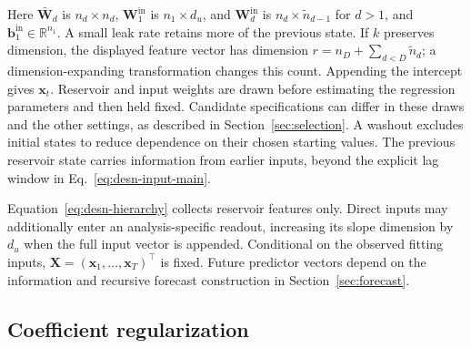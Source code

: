 \documentclass[12pt,letterpaper]{article}
\numberwithin{equation}{section}
\newcommand{\R}{\mathbb{R}}
\newcommand{\vect}[1]{\bm{#1}}
\newcommand{\mat}[1]{\bm{#1}}
\begin{document}
Here \(\bar{\mat W}_d\) is \(n_d\times n_d\),
\(\mat W_1^{\mathrm{in}}\) is \(n_1\times d_u\), and
\(\mat W_d^{\mathrm{in}}\) is \(n_d\times\tilde n_{d-1}\) for \(d>1\),
and \(\vect b_1^{\mathrm{in}}\in\R^{n_1}\).
A small leak rate retains more of the previous state. If \(k\) preserves
dimension, the displayed feature vector
has dimension \(r=n_D+\sum_{d<D}\tilde n_d\); a dimension-expanding
transformation changes this count. Appending the intercept gives \(\vect x_t\).
Reservoir and input weights are drawn before estimating the regression
parameters and then held fixed. Candidate specifications can differ in these
draws and the other settings, as described in Section~\ref{sec:selection}.
A washout excludes initial states to reduce dependence on their chosen
starting values. The previous reservoir state carries information from
earlier inputs, beyond the explicit lag window in Eq.~\eqref{eq:desn-input-main}.

Equation~\eqref{eq:desn-hierarchy} collects reservoir features only. Direct
inputs may additionally enter an analysis-specific readout, increasing its
slope dimension by \(d_u\) when the full input vector is appended.
Conditional on
the observed fitting inputs, \(\mat X=(\vect x_1,\ldots,\vect x_T)^\top\)
is fixed. Future predictor vectors depend on the information and recursive
forecast construction in Section~\ref{sec:forecast}.

\subsection{Coefficient regularization}
\label{subsec:coefficient-regularization}
\end{document}
